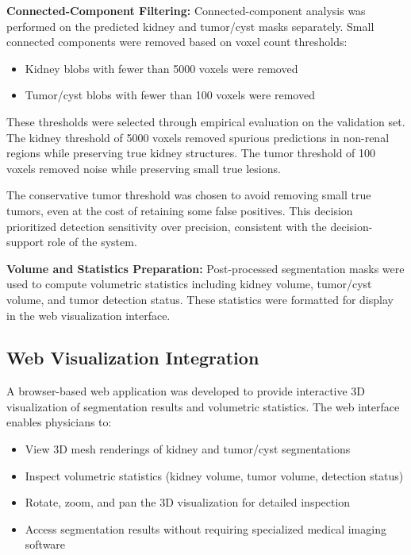 \textbf{Connected-Component Filtering:} Connected-component analysis was performed on the predicted kidney and tumor/cyst masks separately. Small connected components were removed based on voxel count thresholds:
\begin{itemize}
    \item Kidney blobs with fewer than 5000 voxels were removed
    \item Tumor/cyst blobs with fewer than 100 voxels were removed
\end{itemize}

These thresholds were selected through empirical evaluation on the validation set. The kidney threshold of 5000 voxels removed spurious predictions in non-renal regions while preserving true kidney structures. The tumor threshold of 100 voxels removed noise while preserving small true lesions.

The conservative tumor threshold was chosen to avoid removing small true tumors, even at the cost of retaining some false positives. This decision prioritized detection sensitivity over precision, consistent with the decision-support role of the system.

\textbf{Volume and Statistics Preparation:} Post-processed segmentation masks were used to compute volumetric statistics including kidney volume, tumor/cyst volume, and tumor detection status. These statistics were formatted for display in the web visualization interface.

\subsection{Web Visualization Integration}

A browser-based web application was developed to provide interactive 3D visualization of segmentation results and volumetric statistics. The web interface enables physicians to:

\begin{itemize}
    \item View 3D mesh renderings of kidney and tumor/cyst segmentations
    \item Inspect volumetric statistics (kidney volume, tumor volume, detection status)
    \item Rotate, zoom, and pan the 3D visualization for detailed inspection
    \item Access segmentation results without requiring specialized medical imaging software
\end{itemize}

